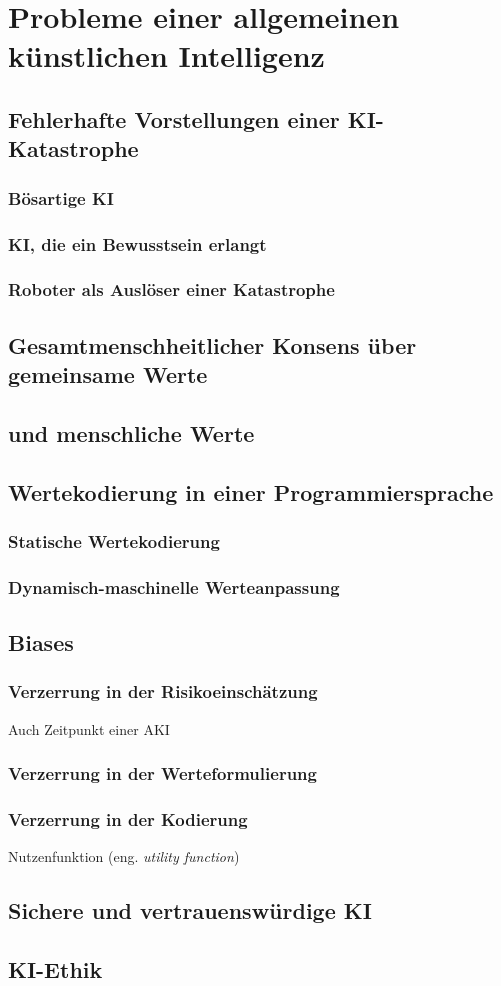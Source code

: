 \chapter{Probleme einer allgemeinen künstlichen Intelligenz}
\section{Fehlerhafte Vorstellungen einer KI-Katastrophe}
\subsection{Bösartige KI}
\subsection{KI, die ein Bewusstsein erlangt}
\subsection{Roboter als Auslöser einer Katastrophe}
\section{Gesamtmenschheitlicher Konsens über gemeinsame Werte}
\section{ und  menschliche Werte}
\section{Wertekodierung in einer Programmiersprache}
\subsection{Statische Wertekodierung}
\subsection{Dynamisch-maschinelle Werteanpassung}
\section{Biases}
\subsection{Verzerrung in der Risikoeinschätzung}
Auch Zeitpunkt einer AKI
\subsection{Verzerrung in der Werteformulierung}
\subsection{Verzerrung in der Kodierung}
Nutzenfunktion (eng. \emph{utility function})
\section{Sichere und vertrauenswürdige KI}
\section{KI-Ethik}
